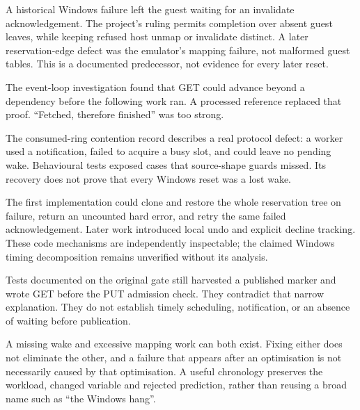 \begin{description}[itemsep=0.7em]
\item[An uncleared translation trigger.] \doc A historical Windows failure left the guest
  waiting for an invalidate acknowledgement. The project's ruling permits completion over
  absent guest leaves, while keeping refused host unmap or invalidate distinct. A later
  reservation-edge defect was the emulator's mapping failure, not malformed guest tables.
  This is a documented predecessor, not evidence for every later reset.
\item[A fetch cursor used as an execution witness.] \doc The event-loop investigation
  found that GET could advance beyond a dependency before the following work ran.
  A processed reference replaced that proof. ``Fetched, therefore finished'' was too strong.
\item[A relay wake with no remaining holder.] \doc The consumed-ring contention record
  describes a real protocol defect: a worker used a notification, failed to acquire a busy
  slot, and could leave no pending wake. Behavioural tests exposed cases that source-shape
  guards missed. Its recovery does not prove that every Windows reset was a lost wake.
\item[Expensive failed sparse admission.] \doc The first implementation could clone and
  restore the whole reservation tree on failure, return an uncounted hard error, and retry
  the same failed acknowledgement. Later work introduced local undo and explicit decline
  tracking. These code mechanisms are independently inspectable; the claimed Windows timing
  decomposition remains unverified without its analysis.
\item[The mapping gate alone blocks observation.] \doc Tests documented on the original
  gate still harvested a published marker and wrote GET before the PUT admission check.
  They contradict that narrow explanation. They do not establish timely scheduling,
  notification, or an absence of waiting before publication.
\end{description}

A missing wake and excessive mapping work can both exist. Fixing either does not eliminate
the other, and a failure that appears after an optimisation is not necessarily caused by that
optimisation. A useful chronology preserves the workload, changed variable and rejected
prediction, rather than reusing a broad name such as ``the Windows hang''.

